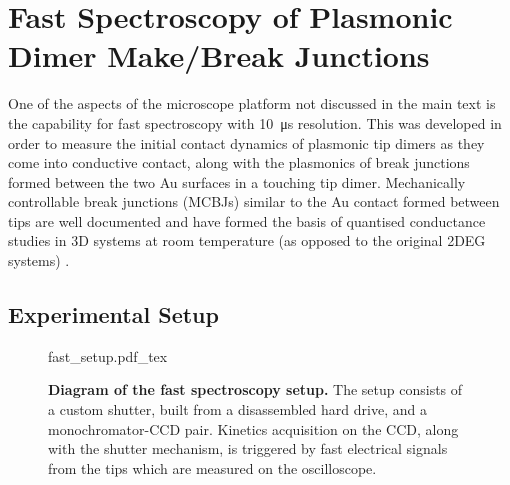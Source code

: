 \documentclass[12pt, a4paper, twoside]{book}
\begin{document}
\chapter{Fast Spectroscopy of Plasmonic Dimer Make/Break Junctions}

One of the aspects of the microscope platform not discussed in the main text is the capability for fast spectroscopy with \SI{10}{\micro\second} resolution. This was developed in order to measure the initial contact dynamics of plasmonic tip dimers as they come into conductive contact, along with the plasmonics of  break junctions formed between the two Au surfaces in a touching tip dimer. Mechanically controllable break junctions (MCBJs) similar to the Au contact formed between tips are well documented and have formed the basis of quantised conductance studies in 3D systems at room temperature (as opposed to the original 2DEG systems) .

\FloatBarrier
\section{Experimental Setup}

\begin{figure}[bt]
\centering
\fontsize{11pt}{1em}\selectfont
{fast_setup.pdf_tex}
\caption[Diagram of the fast spectroscopy setup]{\textbf{Diagram of the fast spectroscopy setup.} The setup consists of a custom shutter, built from a disassembled hard drive, and a monochromator-CCD pair. Kinetics acquisition on the CCD, along with the shutter mechanism, is triggered by fast electrical signals from the tips which are measured on the oscilloscope.}
\label{fig:fast_setup}
\end{figure}
\end{document}
